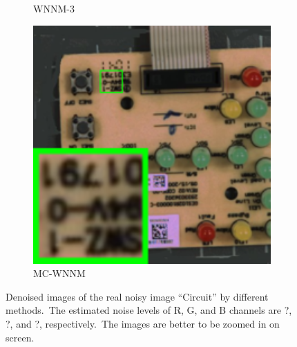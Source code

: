 \begin{figure}
\begin{subfigure}[t]{0.19\textwidth}
		\caption{WNNM-3}
    \end{subfigure}
    \hfill
    \begin{subfigure}[t]{0.19\textwidth}
        \centering
        \includegraphics[width=1\textwidth]{images/mcwnnm/nc/resize_br_CWNNM_ADMM_NL_circuit.png}
		\caption{MC-WNNM}
    \end{subfigure}
    \caption{Denoised images of the real noisy image ``Circuit'' \cite{ncwebsite} by different methods.\ The estimated noise levels of R, G, and B channels are ?, ?, and ?, respectively.\ The images are better to be zoomed in on screen.}
    \label{fig4-12}
\end{figure}


